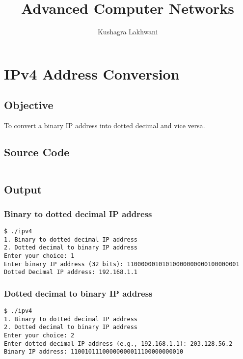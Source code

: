 \documentclass{korigamik}
\title{Advanced Computer Networks}
\author{Kushagra Lakhwani}
\begin{document}
\maketitle
\newpage



\thispagestyle{empty}
\tableofcontents
\newpage

\section{IPv4 Address Conversion}
\label{sec:ipv4}
\subsection{Objective}
To convert a binary IP address into dotted decimal and vice versa.
\subsection{Source Code}
\inputminted[firstline=5, lastline=39, fontsize=\footnotesize]{cpp}{code/ipv4.cpp}

\pagebreak

\subsection{Output}

\subsubsection{Binary to dotted decimal IP address}
\begin{lstlisting}[style=output]
$ ./ipv4
1. Binary to dotted decimal IP address
2. Dotted decimal to binary IP address
Enter your choice: 1
Enter binary IP address (32 bits): 11000000101010000000000100000001
Dotted Decimal IP address: 192.168.1.1
\end{lstlisting}

\subsubsection{Dotted decimal to binary IP address}

\begin{lstlisting}[style=output]
$ ./ipv4
1. Binary to dotted decimal IP address
2. Dotted decimal to binary IP address
Enter your choice: 2
Enter dotted decimal IP address (e.g., 192.168.1.1): 203.128.56.2
Binary IP address: 11001011100000000011100000000010
\end{lstlisting}
\end{document}
